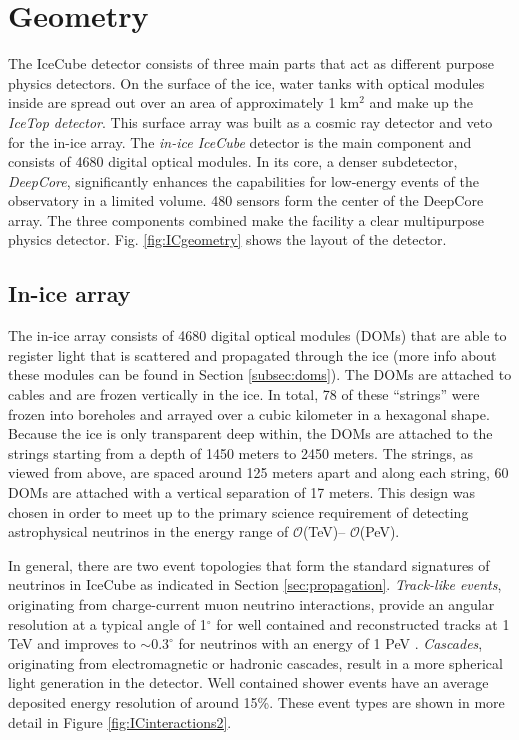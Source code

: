 \section{Geometry}
The IceCube detector consists of three main parts that act as different purpose physics detectors. On the surface of the ice, water tanks with optical modules inside are spread out over an area of approximately 1 km$^2$ and make up the \textit{IceTop detector}. This surface array was built as a cosmic ray detector and veto for the in-ice array. The \textit{in-ice IceCube} detector is the main component and consists of 4680 digital optical modules. In its core, a denser subdetector, \textit{DeepCore}, significantly enhances the capabilities for low-energy events of the observatory in a limited volume. 480 sensors form the center of the DeepCore array. The three components combined make the facility a clear multipurpose physics detector. Fig. \ref{fig:ICgeometry} shows the layout of the detector.

\subsection{In-ice array}
The in-ice array consists of 4680 digital optical modules (DOMs) that are able to register light that is scattered and propagated through the ice (more info about these modules can be found in Section \ref{subsec:doms}). The DOMs are attached to cables and are frozen vertically in the ice. In total, 78 of these ``strings'' were frozen into boreholes and arrayed over a cubic kilometer in a hexagonal shape. Because the ice is only transparent deep within, the DOMs are attached to the strings starting from a depth of 1450 meters to 2450 meters. The strings, as viewed from above, are spaced around 125 meters apart and along each string, 60 DOMs are attached with a vertical separation of 17 meters. This design was chosen
in order to meet up to the primary science requirement of detecting astrophysical neutrinos in the energy range of $\mathcal{O}$(TeV)– $\mathcal{O}$(PeV).

In general, there are two event topologies that form the standard signatures of neutrinos in IceCube as indicated in Section \ref{sec:propagation}. \textit{Track-like events}, originating from charge-current muon neutrino interactions, provide an angular resolution at a typical angle of 1$^\circ$ for well contained and reconstructed tracks at 1 TeV and improves to $\sim 0.3^\circ$ for neutrinos with an energy of 1 PeV \cite{Binnenkort gepubliceerd}
. \textit{Cascades}, originating from electromagnetic or hadronic cascades, result in a more spherical light generation in the detector. Well contained shower events have an average deposited energy resolution of around 15\%. These event types are shown in more detail in Figure \ref{fig:ICinteractions2}.
 
